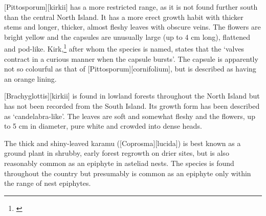 [Pittosporum][kirkii] has a more restricted range, as it is not found further south than the central North Island.
It has a more erect growth habit with thicker stems and longer, thicker, almost fleshy leaves with obscure veins.
The flowers are bright yellow and the capsules are unusually large (up to 4 cm long), flattened and pod-like.
Kirk,\footnote{\cite{kirk1869botany}} after whom the species is named, states that the `valves contract in a curious manner when the capsule bursts'.
The capsule is apparently not so colourful as that of [Pittosporum][cornifolium], but is described as having an orange lining.

[Brachyglottis][kirkii] is found in lowland forests throughout the North Island but has not been recorded from the South Island.
Its growth form has been described as `candelabra-like'.
The leaves are soft and somewhat fleshy and the flowers, up to 5 cm in diameter, pure white and crowded into dense heads.

The thick and shiny-leaved karamu ([Coprosma][lucida]) is best known as a ground plant in shrubby, early forest regrowth on drier sites, but is also reasonably common as an epiphyte in asteliad nests.
The species is found throughout the country but presumably is common as an epiphyte only within the range of nest epiphytes.


